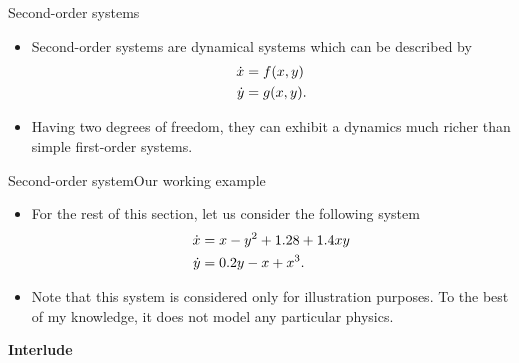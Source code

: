 \documentclass[usenames,dvipsnames,svgnames,10pt,aspectratio=169]{beamer}
\begin{document}
\begin{frame}[t, c]{Second-order systems}{}
	\begin{itemize}
		\item Second-order systems are dynamical systems which can be described by
		\begin{equation}
			\begin{aligned}
				\dot{x} & = f(x, y) \\
				\dot{y} & = g(x, y).
			\end{aligned}
			\notag
		\end{equation}

		\bigskip

		\item Having two degrees of freedom, they can exhibit a dynamics much richer than simple first-order systems.
	\end{itemize}

	\vspace{1cm}
\end{frame}

\begin{frame}[t, c]{Second-order system}{Our working example}
	\begin{itemize}
		\item For the rest of this section, let us consider the following system
		\begin{equation}
			\begin{aligned}
				\dot{x} & = x - y^2 + 1.28 + 1.4 xy \\
				\dot{y} & = 0.2 y - x + x^3.
			\end{aligned}
			\notag
		\end{equation}

		\bigskip

		\item Note that this system is considered only for illustration purposes. To the best of my knowledge, it does not model any particular physics.
	\end{itemize}

	\vspace{1cm}
\end{frame}

\begin{frame}[t, c]{}
	\centering
	\vspace{1cm}

	{\Large \textbf{Interlude}}

	\bigskip

	{}

\end{frame}
\end{document}
